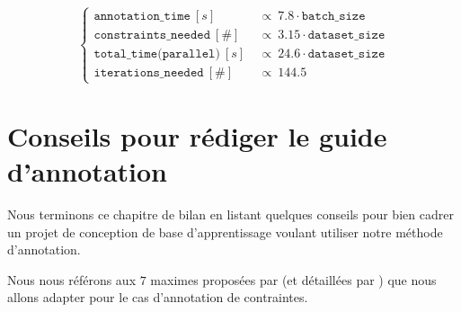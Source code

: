 		\begin{equation}
			\label{equation:5.5-GUIDE-COUTS}
			\begin{cases}
				\texttt{annotation\_time}~[s] &
					~\propto~7.8 \cdot \texttt{batch\_size} \\
				\texttt{constraints\_needed}~[\#] &
					~\propto~3.15 \cdot \texttt{dataset\_size} \\
				\texttt{total\_time(parallel)}~[s] &
					~\propto~24.6 \cdot \texttt{dataset\_size} \\
				\texttt{iterations\_needed}~[\#] &
					~\propto~144.5
			\end{cases}
		\end{equation}
	
	
	\newpage
	\section{Conseils pour rédiger le guide d'annotation}
		\label{section:5.6-GUIDE-REDIGER}
		
		Nous terminons ce chapitre de bilan en listant quelques conseils pour bien cadrer un projet de conception de base d'apprentissage voulant utiliser notre méthode d'annotation.
		\begin{leftBarInformation}
			Nous nous référons aux $7$ maximes proposées par \cite{leech:1993:corpus-annotation-schemes} (et détaillées par \cite{fort:2022:manual-annotation-what}) que nous allons adapter pour le cas d'annotation de contraintes.
		\end{leftBarInformation}
		
